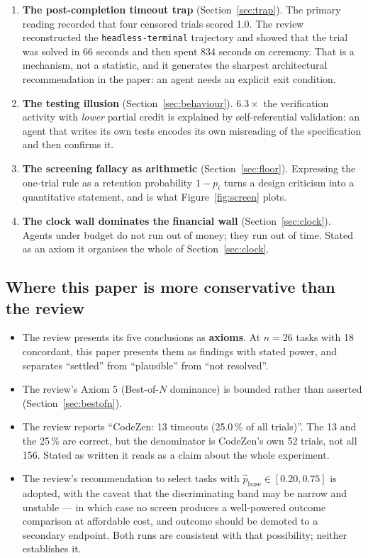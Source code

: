 \documentclass[11pt,a4paper]{article}
\newcommand{\task}[1]{\texttt{\footnotesize #1}}
\begin{document}
\begin{enumerate}
\item \textbf{The post-completion timeout trap} (Section~\ref{sec:trap}). The primary reading
      recorded that four censored trials scored 1.0. The review reconstructed the
      \task{headless-terminal} trajectory and showed that the trial was solved in 66 seconds
      and then spent 834 seconds on ceremony. That is a mechanism, not a statistic, and it
      generates the sharpest architectural recommendation in the paper: an agent needs an
      explicit exit condition.
\item \textbf{The testing illusion} (Section~\ref{sec:behaviour}). $6.3\times$ the
      verification activity with \emph{lower} partial credit is explained by self-referential
      validation: an agent that writes its own tests encodes its own misreading of the
      specification and then confirms it.
\item \textbf{The screening fallacy as arithmetic} (Section~\ref{sec:floor}). Expressing the
      one-trial rule as a retention probability $1 - p_i$ turns a design criticism into a
      quantitative statement, and is what Figure~\ref{fig:screen} plots.
\item \textbf{The clock wall dominates the financial wall} (Section~\ref{sec:clock}).
      Agents under budget do not run out of money; they run out of time. Stated as an axiom it
      organises the whole of Section~\ref{sec:clock}.
\end{enumerate}

\subsection{Where this paper is more conservative than the review}

\begin{itemize}
\item The review presents its five conclusions as \textbf{axioms}. At $n = 26$ tasks with 18
      concordant, this paper presents them as findings with stated power, and separates
      ``settled'' from ``plausible'' from ``not resolved''.
\item The review's Axiom 5 (Best-of-$N$ dominance) is bounded rather than asserted
      (Section~\ref{sec:bestofn}).
\item The review reports ``CodeZen: 13 timeouts (25.0\,\% of all trials)''. The 13 and the
      25\,\% are correct, but the denominator is CodeZen's own 52 trials, not all 156. Stated
      as written it reads as a claim about the whole experiment.
\item The review's recommendation to select tasks with
      $\hat p_{\text{base}} \in [0.20, 0.75]$ is adopted, with the caveat that the
      discriminating band may be narrow and unstable --- in which case no screen produces a
      well-powered outcome comparison at affordable cost, and outcome should be demoted to a
      secondary endpoint. Both runs are consistent with that possibility; neither establishes
      it.
\end{itemize}
\end{document}
